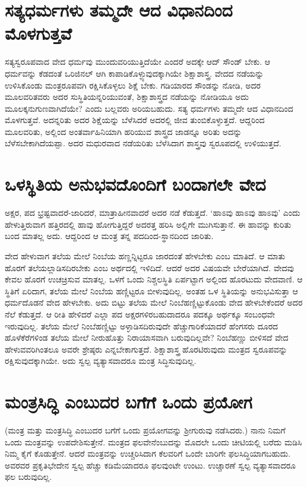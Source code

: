 \section*{ಸತ್ಯಧರ್ಮಗಳು ತಮ್ಮದೇ ಆದ ವಿಧಾನದಿಂದ ಮೊಳಗುತ್ತವೆ}

 ಸತ್ಯಸ್ವರೂಪವಾದ  ವೇದ ಧರ್ಮವು ಮುಂದುವರಿಯುತ್ತಿದೆಯೇ ಎಂದರೆ ಅದಕ್ಕೇ ಆದ್ ಸೌಂಡ್ ಬೇಕು. ಆ ಧರ್ಮವನ್ನು ಕೆಡದಂತೆ ಒರಿಜಿನಲ್ ಆಗಿ ಕಾಪಾಡಿಕೊಳ್ಳ್ಯುವುದಕ್ಕಾಗಿಯೇ ಶಿಕ್ಷಾಶಾಸ್ತ್ರ. ವೇದದ ನಡೆಯನ್ನು ಉಳಿಸಿಕೊಂಡು ಮಂತ್ರರೂಪವಗಿ ರಕ್ಷಿಸಿಕೊಳ್ಳಲು ಶಿಕ್ಷೆ ಬೇಕು. ಗಡಿಯಾರದ ಸೌಂಡನ್ನು ನೋಡಿ, ಅದರ ಮೂಲವರಿತವರು ಅದರ ಸುಸ್ಥಿತಿಯನ್ನರಿಯುವಂತೆ, ಶಿಕ್ಷಾಶಾಸ್ತ್ರದ ನಡೆಯನ್ನು ನೋಡಿಯೂ ಅದು ಮೂಲಕ್ಕನುಗುಣವಾಗಿದೆಯೇ? ಎಂದು ಬಲ್ಲವರು ಅರಿಯಬಹುದು. ಸತ್ಯ ಧರ್ಮಗಳು ತಮ್ಮದೇ ಆದ ವಿಧಾನದಿಂದ ಮೊಳಗುತ್ತವೆ. ಅದನ್ನರಿತು ಅದರ ಶಿಕ್ಷೆಯನ್ನು ಬೆಳೆಸಿದರೆ ಅದರಲ್ಲಿ ಜೀವ ತುಂಬಿಕೊಳ್ಳುತ್ತದೆ. ಆದ್ದರಿಂದ ಮೂಲವರಿತು, ಅಲ್ಲಿಂದ ಅಂತರ್ವಾಹಿನಿಯಾಗಿ ಹರಿಯುವ ಶಾಸ್ತ್ರದ ಜಾಡನ್ನೂ ಅರಿತು ಅದನ್ನು ಬೆಳೆಸಬೇಕಾಗಿದೆಯಪ್ಪಾ. ಅದರ ಮಧುರವಾದ ನಡೆಯರಿತು ಬೆಳೆಸಿದಾಗ ಶಾಸ್ತ್ರವು ಸ್ವರೂಪದಲ್ಲಿ ಉಳಿಯುತ್ತದೆ.

\section*{ಒಳಸ್ಥಿತಿಯ ಅನುಭವದೊಂದಿಗೆ ಬಂದಾಗಲೇ ವೇದ}

ಅಕ್ಷರ, ಪದ ಭ್ರಷ್ಟವಾದರೆ-ಜಾರಿದರೆ, ಮಾತ್ರಾಹೀನವಾದರೆ ಅದರ ನಡೆ ಕೆಡುತ್ತದೆ. `ಹಾಽವು ಹಾಽವು ಹಾಽವು' ಎಂದು ಹೇಳುತ್ತಿರುವಾಗ ಹತ್ತಿರದಲ್ಲಿ ಹಾವು ಹೋಗುತ್ತಿದ್ದರೆ ಅದರತ್ತ ಹರಿಸಿ ಅಲ್ಲಿಗೇ ಮುಗಿಸುತ್ತಾನೆ. ಈ ಹಾವನ್ನು ಕುರಿತು ಬಂದ ಮಾತಲ್ಲ ಅದು. ಆದ್ದರಿಂದ ಆ ಮಂತ್ರ ತನ್ನ ಪದದಿಂದ-ಸ್ಥಾನದಿಂದ ಜಾರಿತು.

ವೇದ ಹೇಳುವಾಗ ತಲೆಯ ಮೇಲೆ ನಿಂಬೆಯ ಹಣ್ಣನ್ನಿಟ್ಟರೂ ಜಾರದಂತೆ ಹೇಳಬೇಕು ಎಂಬ ಮಾತಿದೆ. ಆ ಮಾತು ಹೊರಗೆ ತಲೆಯಲ್ಲಾಡಿಸದಿರಬೇಕು ಎಂಬ ಅರ್ಥದಲ್ಲಿ ಇಳಿದಿದೆ. ಆದರೆ ಅದರ ವಿಷಯವೇ ಬೇರೆಯಾಗಿದೆ. ವೇದವು ಕೇವಲ ಹೊರಗೆ ಉಚಚ್ರಿಸುವ ಮಾತಲ್ಲ. ಒಳಗೆ ಒಂದು ನಿಶ್ಚಲಸ್ಥಿತಿ ಏರ್ಪಟ್ಟಾಗ ಅಲ್ಲಿಂದ ಹೊರಟುದು ವೇದವಾಣಿ. ಆ ಸ್ಥಿತಿಗೆ ಏರಿದಾಗ, ತಲೆಯ ಮೇಲೆ ನಿಂಬೆಯ ಹಣ್ಣಿಟ್ಟರೂ ಬೀಳುವುದಿಲ್ಲ. ಅಂತಹ ಒಳ ಸ್ಥಿತಿಯನ್ನು ಅನುಭವಿಸುತ್ತಾ ಆ ಧರ್ಮದೊಡನೆ ವೇದ ಹೇಳಬೇಕು. ಅದು ಬಿಟ್ಟು ತಲೆಯ ಮೇಲೆ ನಿಂಬೆಹಣ್ಣಿಟ್ಟುಕೊಂಡು ವೇದ ಹೇಳಬೇಕೆಂದರೆ ಅದರ ನೆಲೆ ಕೆಡುತ್ತದೆ. ಆ ರೀತಿ ಹೇಳಿದರೆ ಎಲ್ಲಾ ಪದ ಅಕ್ಷರಗಳಿರಬಹುದಾದರೂ ಪದಕ್ಕೂ ಅರ್ಥಕ್ಕೂ ಸಂಬಂಧವೇ ಇರುವುದಿಲ್ಲ. ತಲೆಯ ಮೇಲೆ ನಿಂಬೆಹಣ್ಣಿಟ್ಟು ಅಳ್ಳಾಡಿಸದಿರುವುದೇ ಹೆಚ್ಚುಗಾರಿಕೆಯಾದರೆ ಹೆಂಗಸರು ದೂರದ ಹೊಳೆಕೆರೆಗಳಿಂಡ ತಲೆಯ ಮೇಲೆ ನೀರುಹೊತ್ತು ನಿರಾಯಾಸವಾಗಿ ಬರುವುದಿಲ್ಲವೇ? ನಿಂಬೆಹಣ್ಣು ಬೀಳಿಸದೆ ವೇದ ಹೇಳುವವರಿಗಿಂತಲೂ ಅವರೇ ಶ್ರೇಷ್ಠರು ಎನ್ನಬೇಕಾಗುತ್ತದೆ. ಶಿಕ್ಷಾಶಾಸ್ತ್ರ ಹೊರಟಿರುವುದು ಮಂತ್ರದ ಸ್ವರೂಪವನ್ನು ರಕ್ಷಿಸುವುದಕ್ಕಾಗಿಯೇ. ಅದು ಸ್ವಲ್ಪ ವ್ಯತ್ಯಾಸವಾದರೂ ಮಂತ್ರ ಸಿದ್ಧಿಸುವುದಿಲ್ಲ.

\section*{ಮಂತ್ರಸಿದ್ಧಿ ಎಂಬುದರ ಬಗೆಗೆ ಒಂದು ಪ್ರಯೋಗ}

(ಮಂತ್ರ ಮತ್ತು ಮಂತ್ರಸಿದ್ಧಿ ಎಂಬುದರ ಬಗೆಗೆ ಒಂದು ಪ್ರಯೋಗವನ್ನು  ಶ್ರೀಗುರುವು ನಡೆಸಿದರು.) ನಾನು ನಿಮಗೆ ಒಂದು ಮಂತ್ರವನ್ನು ಉಪದೇಶಿಸುತ್ತೇನೆ. ಮಂತ್ರದ ಫಲವೇನೆಂಬುದನ್ನು ಮೊದಲೇ ಒಂದು ಚೀಟಿಯಲ್ಲಿ ಬರೆದು ಮಡಿಸಿ ನಿಮ್ಮ ಕೈಗೆ ಕೊಡುತ್ತೇನೆ. ಆದರೆ ಮಂತ್ರವನ್ನು ಉಚ್ಚರಿಸಿದಾಗ ಕೆಲವರಿಗೆ ಒಂದೇ ಬಾರಿಗೇ ಫಲಸಿದ್ಧಿಯಾಗಬಹುದು. ಅವರವರ ಪ್ರಕೃತಿಭೇದೇನ ಸ್ವಲ್ಪ ಹೆಚ್ಚು ಕಡಿಮೆಯಾದರೂ ಫಲವುಂಟೇ ಉಂಟು. ಉಚ್ಚಾರಣೆ ಸ್ವಲ್ಪ ವ್ಯತ್ಯಾಸವಾದರೂ ಫಲ ಬರುವುದಿಲ್ಲ.

